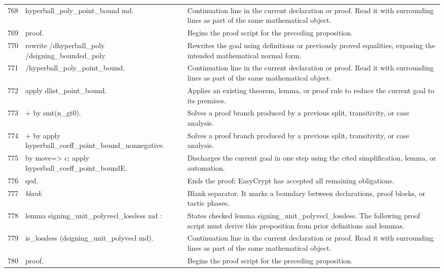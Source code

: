 \documentclass[10pt]{article}
\begin{document}
\begin{longtable}{r L{0.53\textwidth} L{0.37\textwidth}}
768 & {\ttfamily\scriptsize   hyperball\_poly\_point\_bound md.} & Continuation line in the current declaration or proof.  Read it with surrounding lines as part of the same mathematical object. \\
769 & {\ttfamily\scriptsize proof.} & Begins the proof script for the preceding proposition. \\
770 & {\ttfamily\scriptsize rewrite /dhyperball\_poly /dsigning\_bounded\_poly} & Rewrites the goal using definitions or previously proved equalities, exposing the intended mathematical normal form. \\
771 & {\ttfamily\scriptsize         /hyperball\_poly\_point\_bound.} & Continuation line in the current declaration or proof.  Read it with surrounding lines as part of the same mathematical object. \\
772 & {\ttfamily\scriptsize apply dlist\_point\_bound.} & Applies an existing theorem, lemma, or proof rule to reduce the current goal to its premises. \\
773 & {\ttfamily\scriptsize + by smt(n\_gt0).} & Solves a proof branch produced by a previous split, transitivity, or case analysis. \\
774 & {\ttfamily\scriptsize + by apply hyperball\_coeff\_point\_bound\_nonnegative.} & Solves a proof branch produced by a previous split, transitivity, or case analysis. \\
775 & {\ttfamily\scriptsize by move=> c; apply hyperball\_coeff\_point\_boundE.} & Discharges the current goal in one step using the cited simplification, lemma, or automation. \\
776 & {\ttfamily\scriptsize qed.} & Ends the proof; EasyCrypt has accepted all remaining obligations. \\
777 & {\ttfamily\scriptsize \emph{blank}} & Blank separator.  It marks a boundary between declarations, proof blocks, or tactic phases. \\
778 & {\ttfamily\scriptsize lemma signing\_unit\_polyvecl\_lossless md :} & States checked lemma signing\_unit\_polyvecl\_lossless.  The following proof script must derive this proposition from prior definitions and lemmas. \\
779 & {\ttfamily\scriptsize   is\_lossless (dsigning\_unit\_polyvecl md).} & Continuation line in the current declaration or proof.  Read it with surrounding lines as part of the same mathematical object. \\
780 & {\ttfamily\scriptsize proof.} & Begins the proof script for the preceding proposition. \\

\end{longtable}
\end{document}
